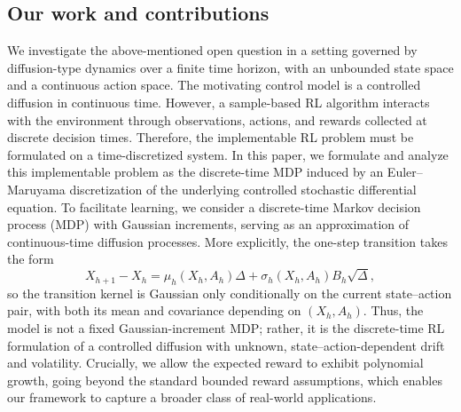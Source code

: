 \documentclass[final,supplement]{siamart251216}
\begin{document}
\subsection{Our work and contributions}
We investigate the above-mentioned open question in a setting governed by diffusion-type dynamics over a finite time horizon, with an unbounded state space and a continuous action space. 
The motivating control model is a controlled diffusion in continuous time. However, a sample-based RL algorithm interacts with the environment through observations, actions, and rewards collected at discrete decision times. Therefore, the implementable RL problem must be formulated on a time-discretized system. In this paper, we formulate and analyze this implementable problem as the discrete-time MDP induced by an Euler--Maruyama discretization of the underlying controlled stochastic differential equation.
To facilitate learning, we consider a discrete-time Markov decision process (MDP) with Gaussian increments, serving as an approximation of continuous-time diffusion processes. 
More explicitly, the one-step transition takes the form
\[
X_{h+1}-X_h=\mu_h(X_h,A_h)\Delta+\sigma_h(X_h,A_h)B_h\sqrt{\Delta},
\]
so the transition kernel is Gaussian only conditionally on the current state--action pair, with both its mean and covariance depending on $(X_h,A_h)$. Thus, the model is not a fixed Gaussian-increment MDP; rather, it is the discrete-time RL formulation of a controlled diffusion with unknown, state--action-dependent drift and volatility.
Crucially, we allow the expected reward to exhibit polynomial growth, going beyond the standard bounded reward assumptions, which enables our framework to capture a broader class of real-world applications.
\end{document}
